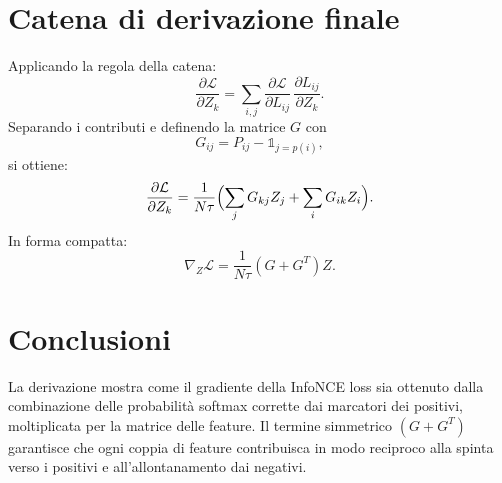 \documentclass[a4paper,11pt]{article}
\begin{document}
\section{Catena di derivazione finale}
Applicando la regola della catena:
\[
\frac{\partial \mathcal{L}}{\partial Z_k} = \sum_{i,j} \frac{\partial \mathcal{L}}{\partial L_{ij}} \, \frac{\partial L_{ij}}{\partial Z_k}.
\]
Separando i contributi e definendo la matrice $G$ con
\[
G_{ij} = P_{ij} - \mathbb{1}_{j=p(i)},
\]
si ottiene:
\[
\frac{\partial \mathcal{L}}{\partial Z_k} = \frac{1}{N \tau} \Bigl(\sum_{j} G_{kj} Z_j + \sum_{i} G_{ik} Z_i\Bigr).
\]
In forma compatta:
\[
\nabla_Z \mathcal{L} = \frac{1}{N \tau} (G + G^T) Z.
\]

\section*{Conclusioni}
La derivazione mostra come il gradiente della InfoNCE loss sia ottenuto dalla combinazione delle probabilità softmax corrette dai marcatori dei positivi, moltiplicata per la matrice delle feature. Il termine simmetrico $(G+G^T)$ garantisce che ogni coppia di feature contribuisca in modo reciproco alla spinta verso i positivi e all'allontanamento dai negativi.
\end{document}
